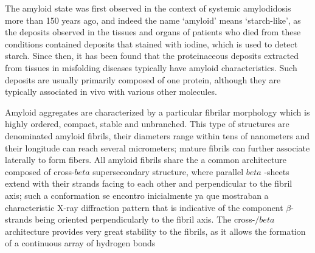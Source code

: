 The amyloid state was first observed in the context of systemic amylodidosis more than 150 years ago, and indeed the name ‘amyloid’ means ‘starch-like’, 
as the deposits observed in the tissues and organs of patients who died from these conditions contained deposits that stained
with iodine, which is used to detect starch. Since then, it has been found that the proteinaceous deposits extracted from tissues in misfolding diseases
typically have amyloid characteristics. Such deposits are usually primarily composed of one protein, although they are typically associated in vivo with various other molecules.

Amyloid aggregates are characterized by a particular fibrilar morphology 
which is highly ordered, compact, stable
and unbranched. This type of structures are denominated amyloid fibrils, their diameters range within tens of nanometers and their longitude can reach several
micrometers; mature fibrils can further associate laterally to form fibers.
All amyloid fibrils share the a common architecture composed of cross-$beta$ supersecondary structure,
where parallel $beta$ -sheets extend with their strands facing to each other and perpendicular to the fibril axis; 
such a conformation se encontro inicialmente ya que mostraban a characteristic X-ray diffraction pattern that is indicative of the component $\beta$-strands being oriented
perpendicularly to the fibril axis. 
The cross-$/beta$ architecture provides very great stability to the fibrils, as it allows the formation of a continuous array of hydrogen bonds

